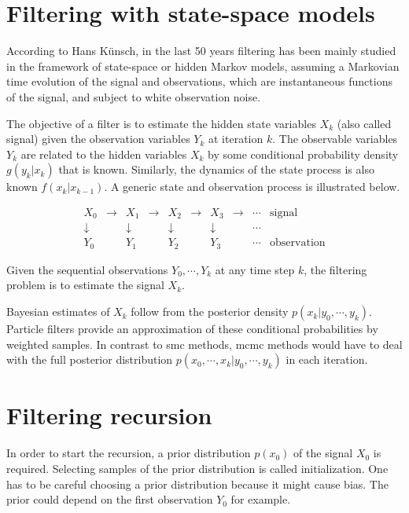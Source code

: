 \section{Filtering with state-space models}

According to Hans Künsch\cite{Kuensch2013}, in the last 50 years filtering has been mainly studied in the framework of state-space or hidden Markov models, assuming a Markovian time evolution of the signal and observations, which are instantaneous functions of the signal, and subject to white observation noise.

The objective of a filter is to estimate the hidden state variables $X_k$ (also called signal) given the observation variables $Y_k$ at iteration $k$. The observable variables $Y_k$ are related to the hidden variables $X_k$ by some conditional probability density $g(y_k|x_k)$ that is known. Similarly, the dynamics of the state process is also known $f(x_k|x_{k-1})$. A generic state and observation process is illustrated below.

\[\begin{array}{cccccccccc}
X_0 & \to & X_1 & \to & X_2 & \to & X_3 & \to & \cdots & \text{signal} \\
\downarrow & & \downarrow & & \downarrow & & \downarrow & & \cdots & \\
Y_0 & & Y_1 & & Y_2 & & Y_3 & & \cdots & \text{observation}
\end{array}\]

Given the sequential observations $Y_0,\cdots,Y_k$ at any time step $k$, the filtering problem is to estimate the signal $X_k$.

Bayesian estimates of $X_k$ follow from the posterior density $p(x_k|y_0,\cdots,y_k)$. Particle filters provide an approximation of these conditional probabilities by weighted samples. In contrast to \gls{smc} methods, \gls{mcmc} methods would have to deal with the full posterior distribution $p(x_0,\cdots,x_k|y_0,\cdots,y_k)$ in each iteration.

\section{Filtering recursion}

In order to start the recursion, a prior distribution $p(x_0)$ of the signal $X_0$ is required. Selecting samples of the prior distribution is called initialization. One has to be careful choosing a prior distribution because it might cause bias. The prior could depend on the first observation $Y_0$ for example.


